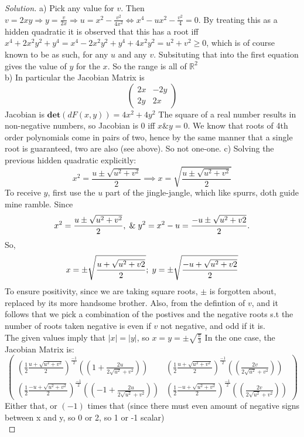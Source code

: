 \documentclass{article}
\newcommand{\R}{\mathbb{R}}
\newcommand{\ma}[1]{\mathbf{#1}}
\newenvironment{problem}[2][Problem]{\begin{trivlist}
\item[\hskip \labelsep {\bfseries #1}\hskip \labelsep {\bfseries #2.}]}{\end{trivlist}}
\newenvironment{solution}{\begin{proof}[Solution]}{\end{proof}}
\begin{document}
\begin{problem}{9.18}
\end{problem}
\begin{solution}
    a) Pick any value for $v$. Then $v =2xy \Rightarrow y = \frac{v}{2x} \Rightarrow u = x^2 -\frac{v^2}{4x^2} \iff x^4 -ux^{2} - \frac{v^2}{4} = 0$. By treating this as a hidden quadratic it is observed that this has a root iff $x^4 +2x^{2}y^{2} +y^{4} = x^{4} - 2x^{2}y^{2} + y^{4} +4x^{2}y^{2} = u^2 + v^2 \geq 0$, which is of course known to be as such, for any $u$ and any $v$. Subsituting that into the first equation gives the value of $y$ for the $x$. So the range is all of $\R^2$
  \\
    b) In particular the Jacobian Matrix is 
    \[
    \begin{pmatrix}
        2x & -2y \\
        2y & 2x
    \end{pmatrix}
    \]
    Jacobian is $\ma{det}(dF(x, y)) = 4x^2 +4y^2$  The square of a real number results in non-negative numbers, so Jacobian is 0 iff $x \& y = 0$. We know that roots of 4th order polynomials come in pairs of two, hence by the same manner that a single root is guaranteed, two are also (see above). So not one-one.
    c) Solving the previous hidden quadratic explicitly: 
    \[
    x^{2} = {\frac{u\pm\sqrt{u^{2}+v^{2}}}{2}} \implies x = \sqrt{\frac{u\pm\sqrt{u^{2}+v^{2}}}{2}}
    \]
    To receive $y$, first use the $u$ part of the jingle-jangle, which like spurrs, doth guide mine ramble. Since
    \[
    x^{2} = \frac{u \pm \sqrt{u^{2}+v^{2}}}{2}, \hspace{1mm} \& \hspace{1mm} y^{2} = x^{2} - u = \frac{-u \pm \sqrt{u^{2}+v{2}}}{2}.
     \]
    So, 
    \[
    x = \pm \sqrt{\frac{u + \sqrt{u^{2}+v{2}}}{2}}; \hspace{1mm} y = \pm \sqrt{\frac{-u + \sqrt{u^{2}+v{2}}}{2}}
    \]
    To ensure positivity, since we are taking square roots, $\pm$ is forgotten about, replaced by its more handsome brother. Also, from the defintion of $v$, and it follows that we pick a combination of the postives and the negative roots s.t the number of roots taken negative is even if $v$ not negative, and odd if it is.
    \\
    The given values imply that $|x| = |y|$, so $x = y = \pm \sqrt{\frac{\pi}{3}}$
    In the one case, the Jacobian Matrix is:
    \[
    \begin{pmatrix}
        \left( \frac{1}{2}\frac{u +\sqrt{u^{2} + v^{2}}}{2}\right)^{\frac{-1}{2}}\left((1+\frac{2u}{2\sqrt{u^{2}}+v^{2}})\right)  & \left( \frac{1}{2}\frac{u +\sqrt{u^{2} + v^{2}}}{2}\right)^{\frac{-1}{2}}\left((\frac{2v}{2\sqrt{u^{2}}+v^{2}})\right)\\
        \left( \frac{1}{2}\frac{-u +\sqrt{u^{2} + v^{2}}}{2}\right)^{\frac{-1}{2}}\left((-1+\frac{2u}{2\sqrt{u^{2}}+v^{2}})\right)   &\left( \frac{1}{2}\frac{-u +\sqrt{u^{2} + v^{2}}}{2}\right)^{\frac{-1}{2}}\left((\frac{2v}{2\sqrt{u^{2}}+v^{2}})\right)
    \end{pmatrix}
    \]
    Either that, or $(-1)$ times that (since there must even amount of negative signs between x and y, so 0 or 2, so 1 or -1 scalar)
    \\


\end{solution}
\end{document}
